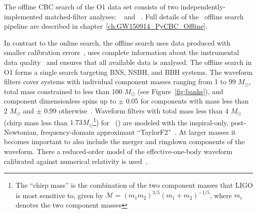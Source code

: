 The offline \ac{CBC} search of the \ac{O1} data set consists of two independently-implemented matched-filter
analyses: \gstlal~\citep{Messick:2016aqy} and
\pycbc~\citep{Usman:2015kfa}.
Full details of the \pycbc{}\ offline search pipeline are described in chapter~\ref{ch:GW150914_PyCBC_Offline}.

In contrast to the online search, the offline search uses data produced with
smaller calibration errors~\citep{Abbott:2016jsd}, uses complete information about the instrumental
data quality~\citep{TheLIGOScientific:2016zmo} and ensures that all available data is analysed.
The offline search in \ac{O1} forms a single search targeting \ac{BNS}, \ac{NSBH}, and \ac{BBH} systems. The
waveform filters cover systems with individual
component masses ranging from 1 to 99 $M_{\odot}$, total mass
constrained to less than 100 $M_{\odot}$ (see Figure~\ref{fig:banks}), and component dimensionless spins up to $\pm$ 0.05
for components with mass less than 2 $M_{\odot}$ and $\pm$ 0.99 otherwise~\citep{TheLIGOScientific:2016pea,Capano:2016dsf}.
Waveform filters with total mass less than 4 $M_{\odot}$ (chirp mass less than
$1.73 {M}_{\odot}$\footnote{\label{foot:note1}The
``chirp mass'' is the combination of the two component masses that
\ac{LIGO} is most sensitive to, given by $\mathcal{M} = (m_1 m_2)^{3/5} (m_1 + m_2)^{-1/5}$, where
$m_i$ denotes the two component masses})
for \pycbc\ (\gstlal) are modeled with the
inspiral-only, post-Newtonian, frequency-domain approximant
``TaylorF2''~\citep{Arun:2008kb,Bohe:2013cla,Blanchet:2013haa,Bohe:2015ana,mishra2016ready}.
At larger masses it becomes important to also include the merger and ringdown components of the waveform.
There a reduced-order model of the effective-one-body waveform calibrated against numerical
relativity is used~\citep{Taracchini:2013rva,Purrer:2015tud}. 
